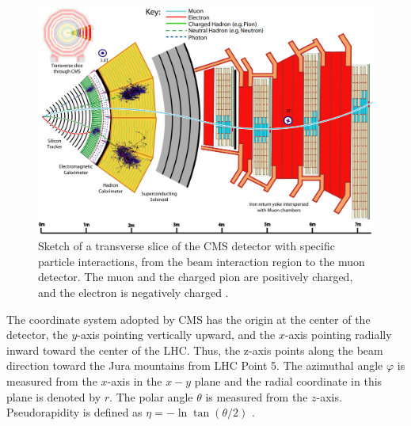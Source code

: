 \begin{center}
  \begin{figure}[ht]
    \centering
    \includegraphics[scale=.3]{Chapter2/slice_det.png}
    \caption[Transverse slice fo CMS detector]{Sketch of a transverse slice of the CMS detector with specific particle interactions, from the beam interaction region to the muon detector. The muon and the charged pion are positively charged, and the electron is negatively charged \cite{det_summary}.}
    \label{slice_CMS}
  \end{figure}
\end{center}


The coordinate system adopted by CMS has the origin at the center of the detector, the $y$-axis pointing vertically upward, and the $x$-axis pointing radially inward toward the center of the LHC. Thus, the z-axis points along the beam direction toward the Jura mountains from LHC Point 5. The azimuthal angle $\varphi$ is measured from the $x$-axis in the $x-y$ plane and the radial coordinate in this plane is denoted by $r$. The polar angle $\theta$ is measured from the $z$-axis. Pseudorapidity is defined as $\eta=- \ln \tan (\theta/2)$ \cite{CMS_Exp_2008}.\\


